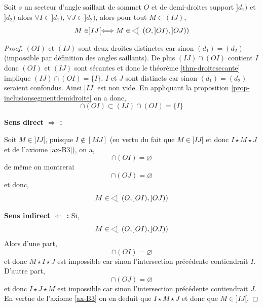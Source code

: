\begin{prop}\label{prop-barrtrans}
    Soit $s$ un secteur d'angle saillant de sommet $O$ et de demi-droites support $]d_1)$ et $]d_2)$ alors $\forall I\in ]d_1)$, $\forall J\in ]d_2)$, alors pour tout $M\in (IJ)$,
    \begin{equation*}
        M\in]IJ[ \Longleftrightarrow M \in \anglesaillant\left({O},{]OI)},{]OJ)}\right)
    \end{equation*}
\begin{proof}

    $(OI)$ et $(IJ)$ sont deux droites distinctes car sinon $(d_1)=(d_2)$ (impossible par définition des angles saillants). De plus $(IJ)\cap(OI)$ contient $I$ donc $(OI)$ et $(IJ)$ sont sécantes et donc le théorème \ref{thm-droitesecante} implique $(IJ)\cap(OI)=\{I\}$. $I$ et $J$ sont distincts car sinon $(d_1)=(d_2)$ seraient confondus. Ainsi $]IJ[$ est non vide. En appliquant la proposition \ref{prop-inclusionsegmentdemidroite} on a donc,
    \begin{equation*}
        [MJ]\cap (OI) \subset (IJ)\cap (OI) = \{I\}
    \end{equation*}
    
    \textbf{Sens direct $\Longrightarrow$ : }

    Soit $M\in]IJ[$, puisque $I \notin [MJ]$ (en vertu du fait que $M\in ]IJ[$ et donc $I\star M \star J$ et de l'axiome \ref{ax-B3}), on a,
    \begin{equation*}
        [MJ]\cap (OI)  = \varnothing
    \end{equation*}
    de même on montrerai
    \begin{equation*}
        [MI]\cap (OJ)  = \varnothing
    \end{equation*}  
    et donc,
    \begin{equation*}
        M \in \anglesaillant\left({O},{]OI)},{]OJ)}\right)
    \end{equation*}

\textbf{Sens indirect $\Longleftarrow$ : }
    Si,
    \begin{equation*}
        M \in \anglesaillant\left({O},{]OI)},{]OJ)}\right)
    \end{equation*}
    Alors d'une part,
    \begin{equation*}
        [MJ]\cap (OI)  = \varnothing
    \end{equation*}
    et donc $M\star I\star J$ est impossible car sinon l'intersection précédente contiendrait $I$. D'autre part, 
    \begin{equation*}
        [MI]\cap (OJ)  = \varnothing
    \end{equation*}
    et donc $I\star J\star M$ est impossible car sinon l'intersection précédente contiendrait $J$. En vertue de l'axiome \ref{ax-B3} on en deduit que $I\star M \star J$ et donc que $M\in ]IJ[$.
\end{proof}
\end{prop}
